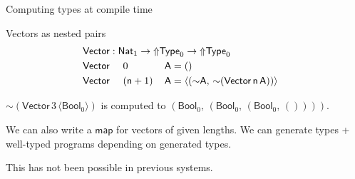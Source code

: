\documentclass[dvipsnames]{beamer}
\newcommand{\ms}[1]{\mathsf{#1}}
\newcommand{\Type}{\mathsf{Type}}
\newcommand{\Bool}{\ms{Bool}}
\newcommand{\vsp}{\vspace{1em}}
\newcommand{\Lift}{{\Uparrow}}
\newcommand{\spl}{{\sim}}
\newcommand{\qut}[1]{\langle #1\rangle}
\begin{document}
\begin{frame}{Computing types at compile time}

\begin{exampleblock}{Vectors as nested pairs}
\vspace{-1.2em}
  \begin{alignat*}{3}
    & \rlap{$\ms{Vector} : \ms{Nat}_1 \to \Lift\Type_0 \to \Lift\Type_0$}\\
    & \ms{Vector}\,\,&& 0      \,&& \ms{A} = ()\\
    & \ms{Vector}\,\,&& (\ms{n} + 1)\,&& \ms{A} = \qut{(\spl\ms{A},\, \spl{(\ms{Vector}\,\ms{n}\,\ms{A})})}
  \end{alignat*}
\end{exampleblock}
\vsp
\pause

$\spl{(\ms{Vector}\,3\,\qut{\Bool_0})}$ is computed to $(\Bool_0,\,(\Bool_0,\,(\Bool_0,\,())))$.
\vsp
\pause

We can also write a $\ms{map}$ for vectors of given lengths. We can generate types +
\alert{well-typed programs depending on generated types}.
\vsp
\pause

This has not been possible in previous systems.

\end{frame}
\end{document}
